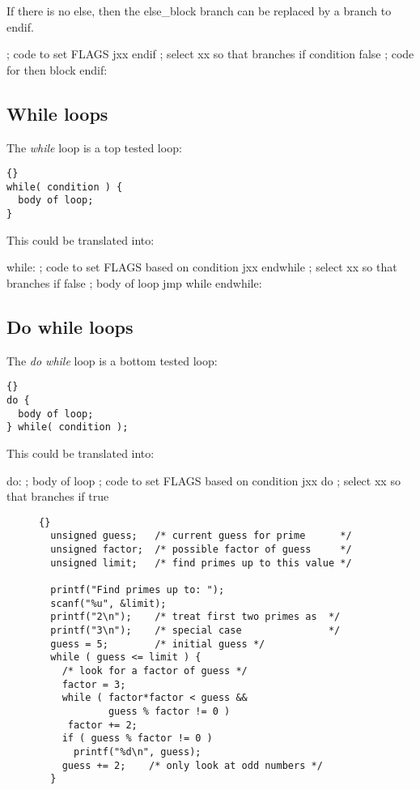 If there is no else, then the {\code else\_block} branch can be replaced by
a branch to {\code endif}.
\begin{AsmCodeListing}[frame=none]
      ; code to set FLAGS
      jxx    endif          ; select xx so that branches if condition false
      ; code for then block
endif:
\end{AsmCodeListing}

\subsection{While loops }
The \emph{while} loop is a top tested loop:
\begin{lstlisting}[stepnumber=0]{}
while( condition ) {
  body of loop;
}
\end{lstlisting}
\noindent This could be translated into:
\begin{AsmCodeListing}[frame=none]
while:
      ; code to set FLAGS based on condition
      jxx    endwhile       ; select xx so that branches if false
      ; body of loop
      jmp    while
endwhile:
\end{AsmCodeListing}

\subsection{Do while loops }
The \emph{do while} loop is a bottom tested loop:
\begin{lstlisting}[stepnumber=0]{}
do {
  body of loop;
} while( condition );
\end{lstlisting}
\noindent This could be translated into:
\begin{AsmCodeListing}[frame=none]
do:
      ; body of loop
      ; code to set FLAGS based on condition
      jxx    do          ; select xx so that branches if true
\end{AsmCodeListing}


\begin{figure}[t]
\begin{lstlisting}[frame=tlrb]{}
  unsigned guess;   /* current guess for prime      */
  unsigned factor;  /* possible factor of guess     */
  unsigned limit;   /* find primes up to this value */

  printf("Find primes up to: ");
  scanf("%u", &limit);
  printf("2\n");    /* treat first two primes as  */
  printf("3\n");    /* special case               */
  guess = 5;        /* initial guess */
  while ( guess <= limit ) {
    /* look for a factor of guess */
    factor = 3;
    while ( factor*factor < guess &&
            guess % factor != 0 )
     factor += 2;
    if ( guess % factor != 0 )
      printf("%d\n", guess);
    guess += 2;    /* only look at odd numbers */
  }
\end{lstlisting}
\caption{}\label{fig:primec}
\end{figure}

